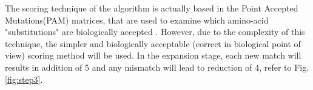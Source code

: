 The scoring technique of the algorithm is actually based in the Point Accepted Mutations(PAM) matrices, that are used to examine which amino-acid "substitutions" are biologically accepted \cite{sotiriades2007design}. However, due to the complexity of this technique, the simpler and biologically acceptable (correct in biological point of view) scoring method will be used. In the expansion stage, each new match will results in addition of 5 and any mismatch will lead to reduction of 4, refer to Fig.\ref{fig:step3}.

